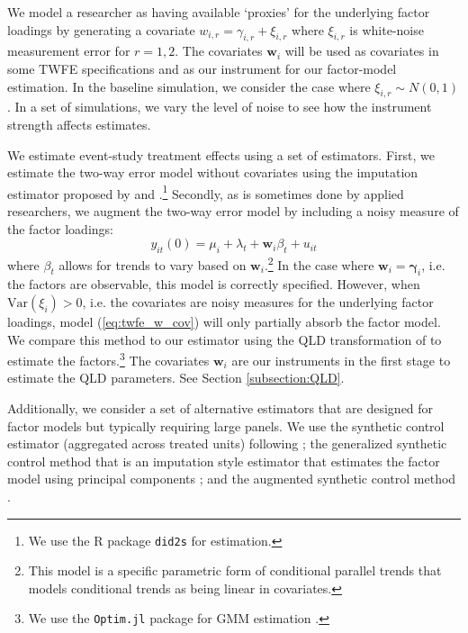 \documentclass[12pt]{article}
\begin{document}
We model a researcher as having available `proxies' for the underlying factor loadings by generating a covariate $w_{i,r} = \gamma_{i,r} + \xi_{i,r}$ where $\xi_{i,r}$ is white-noise measurement error for $r = 1,2$. The covariates $\bm{w}_i$ will be used as covariates in some TWFE specifications and as our instrument for our factor-model estimation. In the baseline simulation, we consider the case where $\xi_{i,r} \sim N(0, 1)$. In a set of simulations, we vary the level of noise to see how the instrument strength affects estimates.

We estimate event-study treatment effects using a set of estimators. First, we estimate the two-way error model without covariates using the imputation estimator proposed by \citet{Borusyak_Jaravel_Spiess_2021} and \citet{Gardner_2021}.\footnote{We use the R package \texttt{did2s} \citep{butts2022did2s} for estimation.} Secondly, as is sometimes done by applied researchers, we augment the two-way error model by including a noisy measure of the factor loadings:
\begin{equation}\label{eq:twfe_w_cov}
  y_{it}(0) = \mu_i + \lambda_t + \bm{w}_i \beta_t + u_{it}
\end{equation}
where $\beta_t$ allows for trends to vary based on $\bm{w}_i$.\footnote{This model is a specific parametric form of conditional parallel trends that models conditional trends as being linear in covariates.} In the case where $\bm{w}_i = \bm{\gamma}_i$, i.e. the factors are observable, this model is correctly specified. However, when $\text{Var}(\xi_i) > 0$, i.e. the covariates are noisy measures for the underlying factor loadings, model (\ref{eq:twfe_w_cov}) will only partially absorb the factor model. We compare this method to our estimator using the QLD transformation of \citet{Ahn_Lee_Schmidt_2013} to estimate the factors.\footnote{We use the \texttt{Optim.jl} package for GMM estimation \citep{mogensen2018optim}.} The covariates $\bm{w}_i$ are our instruments in the first stage to estimate the QLD parameters. See Section \ref{subsection:QLD}.

Additionally, we consider a set of alternative estimators that are designed for factor models but typically requiring large panels. We use the synthetic control estimator (aggregated across treated units) following \citet{abadie2010synthetic,ben2021augmented}; the generalized synthetic control method that is an imputation style estimator that estimates the factor model using principal components \citep{xu2017generalized}; and the augmented synthetic control method \citep{ben2021augmented}. 
\end{document}
